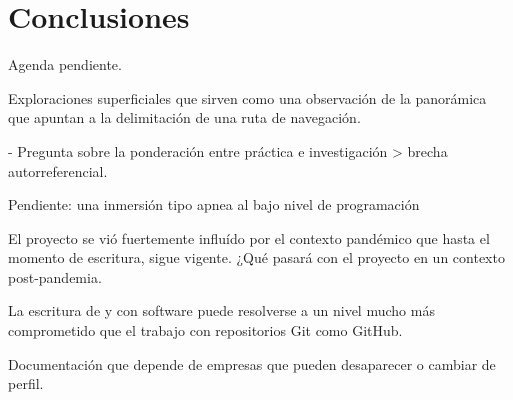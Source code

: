 \section*{Conclusiones}

Agenda pendiente.

Exploraciones superficiales que sirven como una observación de la panorámica que apuntan a la delimitación de una ruta de navegación.

- Pregunta sobre la ponderación entre práctica e investigación > brecha autorreferencial. 

Pendiente: una inmersión tipo apnea al bajo nivel de programación

El proyecto se vió fuertemente influído por el contexto pandémico que hasta el momento de escritura, sigue vigente. ¿Qué pasará con el proyecto en un contexto post-pandemia.

La escritura de y con software puede resolverse a un nivel mucho más comprometido que el trabajo con repositorios Git como GitHub.

Documentación que depende de empresas que pueden desaparecer o cambiar de perfil. 
